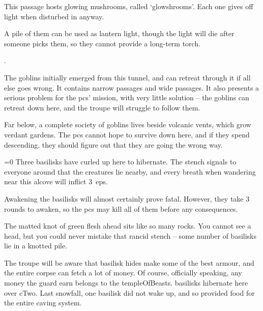 \begin{multicols}{2}


This passage hosts glowing mushrooms, called `\glspl{glowshroom}'.
Each one gives off light when disturbed in anyway.

A pile of them can be used as lantern light, though the light will die after  someone picks them, so they cannot provide a long-term torch.


.


The goblins initially emerged from this tunnel, and can retreat through it if all else goes wrong.
It contains narrow passages and wide passages.
It also presents a serious problem for the \glspl{pc}' mission, with very little solution -- the goblins can retreat down here, and the troupe will struggle to follow them.

Far below, a complete society of goblins lives beside volcanic vents, which grow verdant gardens.
The \glspl{pc} cannot hope to survive down here, and if they spend  descending, they should figure out that they are going the wrong way.


\ifnum\value{temperature}=0
  Three \glspl{basilisk} have curled up here to hibernate.
  The stench signals to everyone around that the creatures lie nearby, and every breath when wandering near this alcove will inflict 3~\glspl{ep}.

  Awakening the \glspl{basilisk} will almost certainly prove fatal.
  However, they take 3 rounds to awaken, so the \glspl{pc} may kill all of them before any consequences.

  \begin{boxtext}
    The matted knot of green flesh ahead sits like so many rocks.
    You cannot see a head, but you could never mistake that rancid stench -- some number of \glspl{basilisk} lie in a knotted pile.
  \end{boxtext}


  The troupe will be aware that \gls{basilisk} hides make some of the best armour, and the entire corpse can fetch a lot of money.
  Of course, officially speaking, any money the \gls{guard} earn belongs to the \gls{templeOfBeasts}.%
\else
  \Glspl{basilisk} hibernate here over \gls{cTwo}.
  Last snowfall, one \gls{basilisk} did not wake up, and so provided food for the entire caving system.


\end{multicols}
